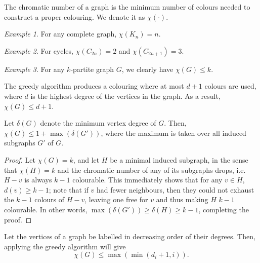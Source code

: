 \documentclass[11pt]{article}
\theoremstyle{definition}
\theoremstyle{remark}
\newtheorem*{example}{Example}
\numberwithin{equation}{section}
\begin{document}
    \begin{definition}
        The chromatic number of a graph is the minimum number of colours needed to
        construct a proper colouring. We denote it as $\chi(\cdot)$.
    \end{definition}
    \begin{example}
        For any complete graph, $\chi(K_n) = n$.
    \end{example}
    \begin{example}
        For cycles, $\chi(C_{2n}) = 2$ and $\chi(C_{2n + 1}) = 3$.
    \end{example}
    \begin{example}
        For any $k$-partite graph $G$, we clearly have $\chi(G) \leq k$.
    \end{example}

    \begin{lemma}
        The greedy algorithm produces a colouring where at most $d + 1$ colours are
        used, where $d$ is the highest degree of the vertices in the graph. As a
        result, $\chi(G) \leq d + 1$.
    \end{lemma}

    \begin{theorem}
        Let $\delta(G)$ denote the minimum vertex degree of $G$. Then, $\chi(G) \leq
        1 + \max(\delta(G'))$, where the maximum is taken over all induced subgraphs
        $G'$ of $G$.
    \end{theorem}
    \begin{proof}
        Let $\chi(G) = k$, and let $H$ be a minimal induced subgraph, in the sense
        that $\chi(H) = k$ and the chromatic number of any of its subgraphs drops,
        i.e.\ $H - v$ is always $k - 1$ colourable. This immediately shows that for
        any $v \in H$, $d(v) \geq k - 1$; note that if $v$ had fewer neighbours, then
        they could not exhaust the $k - 1$ colours of $H - v$, leaving one free for
        $v$ and thus making $H$ $k - 1$ colourable. In other words, $\max(\delta(G'))
        \geq \delta(H) \geq k - 1$, completing the proof.
    \end{proof}

    \begin{lemma}
        Let the vertices of a graph be labelled in decreasing order of their degrees.
        Then, applying the greedy algorithm will give \[
            \chi(G) \leq \max(\min(d_i + 1, i)).
        \] 
    \end{lemma}
\end{document}
